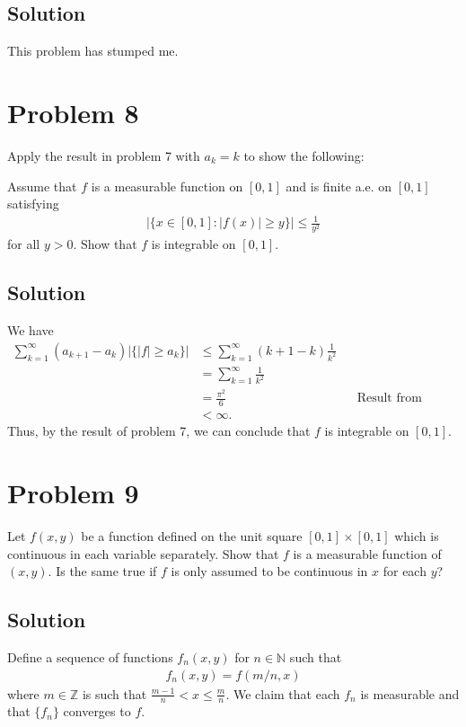 \documentclass[10pt,a4paper]{article}
\theoremstyle{theorem}
\theoremstyle{definition}
\begin{document}
\subsection*{Solution}
This problem has stumped me.

\section*{Problem 8}
Apply the result in problem 7 with $a_k = k$ to show the following:

Assume that $f$ is a measurable function on $[0, 1]$ and is finite a.e. on $[0, 1]$ satisfying 
\begin{align*}
|\{x \in[0, 1]: |f(x)| \geq y \}| \leq \frac{1}{y^2}
\end{align*}
for all $y > 0$. Show that $f$ is integrable on $[0, 1]$.

\subsection*{Solution}
We have 
\begin{align*}
\sum_{k = 1}^\infty (a_{k + 1} - a_k)|\{|f| \geq a_k \}| &\leq \sum_{k = 1}^\infty (k + 1 - k)\frac{1}{k^2}\\
&= \sum_{k = 1}^\infty \frac{1}{k^2}\\
&= \frac{\pi^2}{6} &&\text{Result from elementary analysis}\\
&< \infty.
\end{align*}
Thus, by the result of problem 7, we can conclude that $f$ is integrable on $[0, 1]$.

\section*{Problem 9}
Let $f(x, y)$ be a function defined on the unit square $[0, 1] \times [0, 1]$ which is continuous in each variable separately. Show that $f$ is a measurable function of $(x, y)$. Is the same true if $f$ is only assumed to be continuous in $x$ for each $y$?

\subsection*{Solution}
Define a sequence of functions $f_n(x, y)$ for $n \in \mathbb{N}$ such that
\begin{align*}
f_n(x, y) = f(m/n, x)
\end{align*}
where $m \in \mathbb{Z}$ is such that $\frac{m-1}{n}< x \leq \frac{m}{n}$.  We claim that each $f_n$ is measurable and that $\{f_n\}$ converges to $f$.
\end{document}
